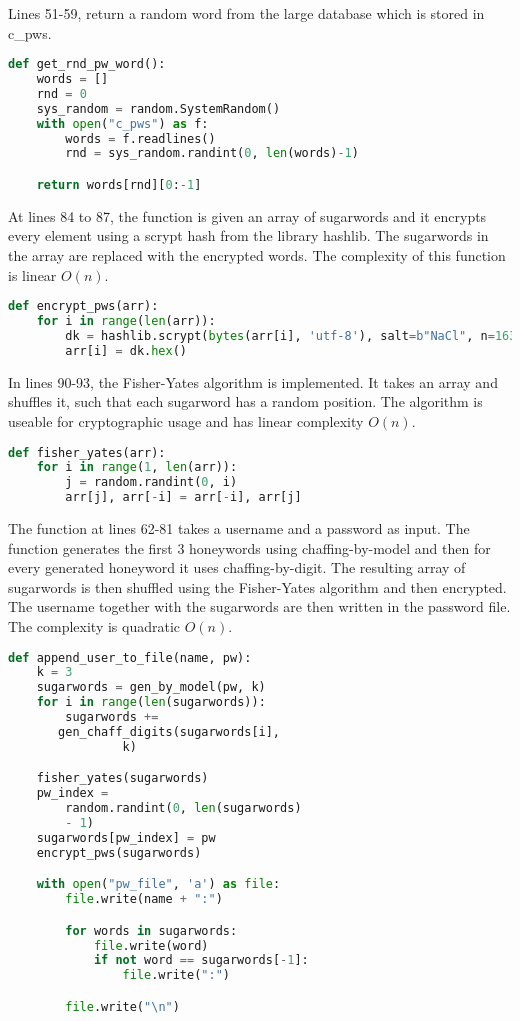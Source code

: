 \documentclass[../main.tex]{subfiles}
\begin{document}
Lines 51-59, return a random word from the large database which is stored in c\_pws.

\begin{lstlisting}[language=Python]
def get_rnd_pw_word():
    words = []
    rnd = 0
    sys_random = random.SystemRandom()
    with open("c_pws") as f:
        words = f.readlines()
        rnd = sys_random.randint(0, len(words)-1)

    return words[rnd][0:-1]
\end{lstlisting}

At lines 84 to 87, the function is given an array of sugarwords and it encrypts every element
using a scrypt hash from the library hashlib. The sugarwords in the array are replaced with
the encrypted words. The complexity of this function is linear \(O(n)\).

\begin{lstlisting}[language=Python]
def encrypt_pws(arr):
    for i in range(len(arr)):
        dk = hashlib.scrypt(bytes(arr[i], 'utf-8'), salt=b"NaCl", n=16384, r=8, p=16)
        arr[i] = dk.hex()
\end{lstlisting}

In lines 90-93, the Fisher-Yates algorithm is implemented. It takes an array and shuffles it, such
that each sugarword has a random position. The algorithm is useable for cryptographic usage and
has linear complexity \(O(n)\).

\begin{lstlisting}[language=Python]
def fisher_yates(arr):
    for i in range(1, len(arr)):
        j = random.randint(0, i)
        arr[j], arr[-i] = arr[-i], arr[j]
\end{lstlisting}

The function at lines 62-81 takes a username and a password as input. The function generates
the first 3 honeywords using chaffing-by-model and then for every generated honeyword it uses
chaffing-by-digit. The resulting array of sugarwords is then shuffled using the Fisher-Yates
algorithm and then encrypted. The username together with the sugarwords are then written
in the password file. The complexity is quadratic \(O(n)\).

\begin{lstlisting}[language=Python]
def append_user_to_file(name, pw):
    k = 3
    sugarwords = gen_by_model(pw, k)
    for i in range(len(sugarwords)):
        sugarwords += 
	   gen_chaff_digits(sugarwords[i], 
	   			k)

    fisher_yates(sugarwords)
    pw_index = 
        random.randint(0, len(sugarwords) 
		- 1)
    sugarwords[pw_index] = pw
    encrypt_pws(sugarwords)

    with open("pw_file", 'a') as file:
        file.write(name + ":")

        for words in sugarwords:
            file.write(word)
            if not word == sugarwords[-1]:
                file.write(":")

        file.write("\n")
\end{lstlisting}
\end{document}
